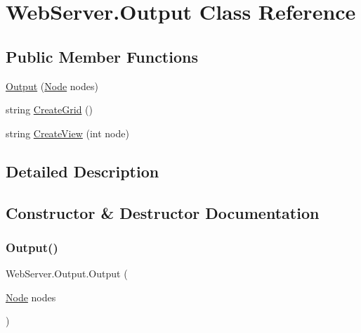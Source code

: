 \hypertarget{class_web_server_1_1_output}{}\section{Web\+Server.\+Output Class Reference}
\label{class_web_server_1_1_output}


 


\subsection*{Public Member Functions}
\begin{DoxyCompactItemize}
\item 
\hyperlink{class_web_server_1_1_output_ae3a25c0f36552504766dd7119c4db56d}{Output} (\hyperlink{class_web_server_1_1_node}{Node} nodes)
\item 
string \hyperlink{class_web_server_1_1_output_a422c76e72ef2cb2f4d1a270230c15e15}{Create\+Grid} ()
\item 
string \hyperlink{class_web_server_1_1_output_abbf9c895337a7b5c90f819e5f4f99c82}{Create\+View} (int node)
\end{DoxyCompactItemize}


\subsection{Detailed Description}




\subsection{Constructor \& Destructor Documentation}
\mbox{\label{class_web_server_1_1_output_ae3a25c0f36552504766dd7119c4db56d}} 
\subsubsection{\texorpdfstring{Output()}{Output()}}
{\footnotesize\ttfamily Web\+Server.\+Output.\+Output (\begin{DoxyParamCaption}\item[{\hyperlink{class_web_server_1_1_node}{Node}}]{nodes }\end{DoxyParamCaption})}






